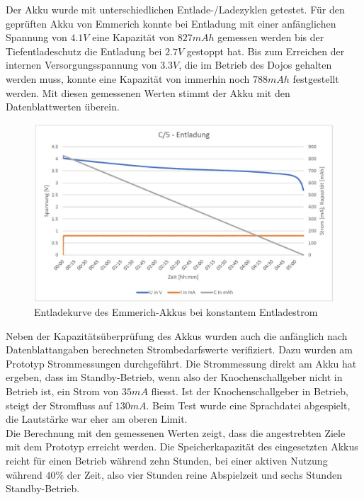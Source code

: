 Der Akku wurde mit unterschiedlichen Entlade-/Ladezyklen getestet. Für den geprüften Akku von Emmerich konnte bei Entladung mit einer anfänglichen Spannung von $4.1V$ eine Kapazität von $827mAh$ gemessen werden bis der Tiefentladeschutz die Entladung bei $2.7V$ gestoppt hat. Bis zum Erreichen der internen Versorgungsspannung von $3.3V$, die im Betrieb des Dojos gehalten werden muss, konnte eine Kapazität von immerhin noch $788mAh$ festgestellt werden. Mit diesen gemessenen Werten stimmt der Akku mit den Datenblattwerten überein.\\

\begin{figure}[htp]
	\centering
	\includegraphics[width=15cm]{Bilder/Entladekurve.JPG}
	 \caption{Entladekurve des Emmerich-Akkus bei konstantem Entladestrom}
	 \label{fig:Entladekurve}
\end{figure}

Neben der Kapazitätsüberprüfung des Akkus wurden auch die anfänglich nach Datenblattangaben berechneten Strombedarfswerte verifiziert. Dazu wurden am Prototyp Strommessungen durchgeführt. Die Strommessung direkt am Akku hat ergeben, dass im Standby-Betrieb, wenn also der Knochenschallgeber nicht in Betrieb ist, ein Strom von $35mA$ fliesst. Ist der Knochenschallgeber in Betrieb, steigt der Stromfluss auf $130mA$. Beim Test wurde eine Sprachdatei abgespielt, die Lautstärke war eher am oberen Limit.\\

Die Berechnung mit den gemessenen Werten zeigt, dass die angestrebten Ziele mit dem Prototyp erreicht werden. Die Speicherkapazität des eingesetzten Akkus reicht für einen Betrieb während zehn Stunden, bei einer aktiven Nutzung während $40\%$ der Zeit, also vier Stunden reine Abspielzeit und sechs Stunden Standby-Betrieb.\\

